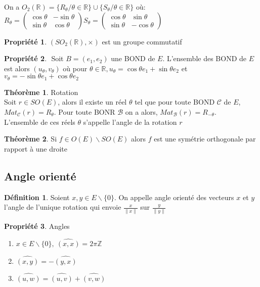 \documentclass[fleqn]{article}
\theoremstyle{definition} \newtheorem*{defi}{D\'efinition}
\theoremstyle{definition} \newtheorem*{theo}{Th\'eor\`eme}
\theoremstyle{definition} \newtheorem*{coro}{Corollaire}
\theoremstyle{remark} \newtheorem*{rqs}{Remarques}
\theoremstyle{definition} \newtheorem*{prop}{Propri\'et\'e}
\begin{document}
On a $O_2(\mathbb{R}) = \{R_{\theta} / \theta \in \mathbb{R}\} \cup \{S_\theta / \theta \in \mathbb{R}\}$ o\`u: \\
$R_\theta =
\begin{pmatrix}
	\cos \theta & -\sin \theta\\
	\sin \theta & \cos \theta
\end{pmatrix}
S_\theta =
\begin{pmatrix}
	\cos \theta & \sin \theta\\
	\sin \theta & -\cos \theta
\end{pmatrix}$

\begin{prop}
	$(SO_2(\mathbb{R}),\times)$ est un groupe commutatif
\end{prop}

\begin{prop} $ $
	Soit $B = (e_1, e_2)$ une BOND de $E$. L'ensemble des BOND de $E$ est alors $(u_\theta, v_\theta)$ o\`u pour $\theta \in \mathbb{R},
	u_\theta = \cos \theta e_1 + \sin \theta e_2$ et $v_\theta = -\sin \theta e_1 + \cos \theta e_2$
\end{prop}

\begin{theo} Rotation \\
	Soit $r \in SO(E)$, alors il existe un r\'eel $\theta$ tel que pour toute BOND $\mathscr{C}$ de $E$, $Mat_\mathscr{C}(r) = R_\theta$. Pour
	toute BONR $\mathscr{B}$ on a alors, $Mat_\mathscr{B}(r) = R_{-\theta}$. \\
	L'ensemble de ces r\'eels $\theta$ s'appelle l'angle de la rotation $r$
\end{theo}

\begin{theo}
	Si $f \in O(E) \backslash SO(E)$ alors $f$ est une sym\'etrie orthogonale par rapport \`a une droite
\end{theo}

\subsection{Angle orient\'e}

\begin{defi}
	Soient $x,y \in E\backslash \{0\}$. On appelle angle orient\'e des vecteurs $x$ et $y$ l'angle de l'unique rotation qui envoie
	$\frac{x}{\|x\|}$ sur $\frac{y}{\|y\|}$
\end{defi}

\begin{prop} Angles
	\begin{enumerate}
		\item $x \in E \backslash \{0\},\ \hat{(x,x)} = 2\pi\mathbb{Z}$
		\item $\hat{(x,y)} = -\hat{(y,x)}$
		\item $\hat{(u,w)} = \hat{(u,v)} + \hat{(v,w)}$
	\end{enumerate}
\end{prop}
\end{document}
